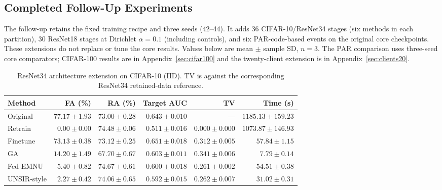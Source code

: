 \subsection{Completed Follow-Up Experiments}

\label{sec:followup}

The follow-up retains the fixed training recipe and three seeds (42--44). It adds 36 CIFAR-10/ResNet34 stages (six methods in each partition), 30 ResNet18 stages at Dirichlet $\alpha=0.1$ (including controls), and six PAR-code-based events on the original core checkpoints. These extensions do not replace or tune the core results.  Values below are mean $\pm$ sample SD, $n=3$. The PAR comparison uses three-seed core comparators; CIFAR-100 results are in Appendix~\ref{sec:cifar100} and the twenty-client extension is in Appendix~\ref{sec:clients20}.

\begin{table}[H]
\caption{ResNet34 architecture extension on CIFAR-10 (IID). TV is against the corresponding ResNet34 retained-data reference.}
\label{tab:r34-iid}
\centering\scriptsize\setlength{\tabcolsep}{3.5pt}
\begin{tabular}{lrrrrr}
\toprule
Method & FA (\%) & RA (\%) & Target AUC & TV & Time (s)\\
\midrule
Original & $77.17 \pm 1.93$ & $73.00 \pm 0.28$ & $0.643 \pm 0.010$ & --- & $1185.13 \pm 159.23$\\
Retrain & $0.00 \pm 0.00$ & $74.48 \pm 0.06$ & $0.511 \pm 0.016$ & $0.000 \pm 0.000$ & $1073.87 \pm 146.93$\\
Finetune & $73.13 \pm 0.38$ & $73.12 \pm 0.25$ & $0.651 \pm 0.018$ & $0.312 \pm 0.005$ & $57.84 \pm 1.15$\\
GA & $14.20 \pm 1.49$ & $67.70 \pm 0.67$ & $0.603 \pm 0.011$ & $0.341 \pm 0.006$ & $7.79 \pm 0.14$\\
Fed-EMNU & $5.40 \pm 0.82$ & $74.67 \pm 0.61$ & $0.600 \pm 0.018$ & $0.261 \pm 0.002$ & $54.51 \pm 0.38$\\
UNSIR-style & $2.27 \pm 0.42$ & $74.06 \pm 0.65$ & $0.592 \pm 0.015$ & $0.262 \pm 0.007$ & $31.02 \pm 0.31$\\
\bottomrule
\end{tabular}
\end{table}

